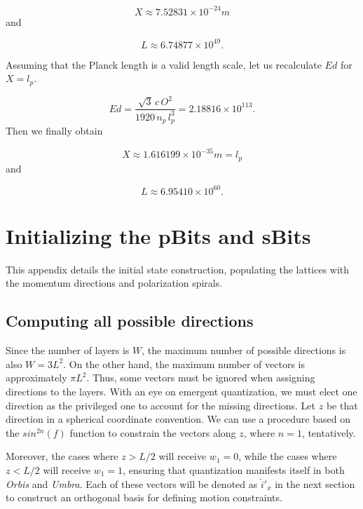 \documentclass[12pt]{article}
\begin{document}
\[
X\approx7.52831\times10^{-24}m
\]
and

\[
L\approx6.74877\times10^{49}.
\]

Assuming that the Planck length is a valid length scale, let us recalculate
$Ed$ for $X=l_{p}$.

\[
Ed=\frac{\sqrt{3}\,c\,O^{2}}{1920\,n_{p}\,l_{p}^{3}}=2.18816\times10^{113}.
\]
Then we finally obtain

\[
X\approx1.616199\times10^{-35}m=l_{p}
\]
and

\[
L\approx6.95410\times10^{60}.
\]


\newpage{}
\section{Initializing the pBits and sBits} \label{sec:pBits-sBits}

This appendix details the initial state construction, populating the lattices with the momentum directions and polarization spirals.

\subsection{Computing all possible directions} \label{subsec:all-dirs}

Since the number of layers is $W  $, the maximum number of possible directions is also $W   = 3L^2$. On the other hand, the maximum  number of vectors is approximately $\pi L^2$. Thus, some vectors must be ignored when assigning directions to the layers. With an eye on emergent quantization, we must elect one direction as the privileged one to account for the missing directions. Let $z$ be that direction in a spherical coordinate convention. We can use a procedure based on the $sin^{2n}(f)$ function to constrain the vectors along $z$, where $n=1$, tentatively.

Moreover, the cases where $z > L/2$ will receive $w_1 = 0$, while the cases where $z < L/2$ will receive $w_1 = 1$, ensuring that quantization manifests itself in both \textit{Orbis} and \textit{Umbra}. Each of these vectors will be denoted as $\hat{i}'_x$ in the next section to construct an orthogonal basis for defining motion constraints.
\end{document}
